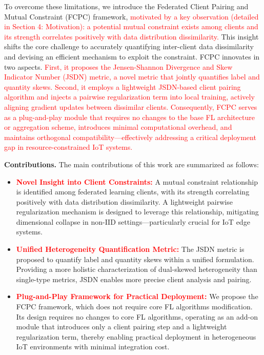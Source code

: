 \documentclass[journal,twoside,web]{ieeecolor}
\newcommand{\rev}[1]{\textcolor{red}{#1}}
\begin{document}
To overcome these limitations, we introduce the Federated Client Pairing and Mutual Constraint (FCPC) framework, \rev{motivated by a key observation (detailed in Section 4: Motivation): a potential mutual constraint exists among clients and its strength correlates positively with data distribution dissimilarity.} This insight shifts the core challenge to accurately quantifying inter-client data dissimilarity and devising an efficient mechanism to exploit the constraint. FCPC innovates in two aspects. \rev{First, it proposes the Jensen-Shannon Divergence and Skew Indicator Number (JSDN) metric, a novel metric that jointly quantifies label and quantity skews. Second, it employs a lightweight JSDN-based client pairing algorithm and injects a pairwise regularization term into local training, actively aligning gradient updates between dissimilar clients. Consequently, FCPC serves as a plug-and-play module that requires no changes to the base FL architecture or aggregation scheme, introduces minimal computational overhead, and maintains orthogonal compatibility—effectively addressing a critical deployment gap in resource-constrained IoT systems.}



\textbf{Contributions.} The main contributions of this work are summarized as follows:

\begin{itemize}
      \item \textbf{\rev{Novel Insight into Client Constraints:}} A mutual constraint relationship is identified among federated learning clients, with its strength correlating positively with data distribution dissimilarity. A lightweight pairwise regularization mechanism is designed to leverage this relationship, mitigating dimensional collapse in non-IID settings—particularly crucial for IoT edge systems.

    \item \textbf{\rev{Unified Heterogeneity Quantification Metric:}} The JSDN metric is proposed to quantify label and quantity skews within a unified formulation. Providing a more holistic characterization of dual-skewed heterogeneity than single-type metrics, JSDN enables more precise client analysis and pairing.

    \item \textbf{\rev{Plug-and-Play Framework for Practical Deployment:}} We propose the FCPC framework, which does not require core FL algorithms modification. Its design requires no changes to core FL algorithms, operating as an add-on module that introduces only a client pairing step and a lightweight regularization term, thereby enabling practical deployment in heterogeneous IoT environments with minimal integration cost.
    
\end{itemize}
\end{document}
